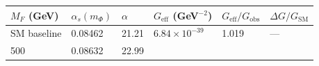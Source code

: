 \documentclass[
  11pt,
]{article}
\begin{document}
\begin{longtable}[]{@{}llllll@{}}
\toprule
\begin{minipage}[b]{0.14\columnwidth}\raggedright
\(M_F\) (GeV)\strut
\end{minipage} & \begin{minipage}[b]{0.14\columnwidth}\raggedright
\(\alpha_s(m_\Phi)\)\strut
\end{minipage} & \begin{minipage}[b]{0.14\columnwidth}\raggedright
\(\alpha\)\strut
\end{minipage} & \begin{minipage}[b]{0.14\columnwidth}\raggedright
\(G_{\text{eff}}\) (GeV\(^{-2}\))\strut
\end{minipage} & \begin{minipage}[b]{0.14\columnwidth}\raggedright
\(G_{\text{eff}}/G_{\text{obs}}\)\strut
\end{minipage} & \begin{minipage}[b]{0.14\columnwidth}\raggedright
\(\Delta G/G_{\text{SM}}\)\strut
\end{minipage}\tabularnewline
\midrule
\endhead
\begin{minipage}[t]{0.14\columnwidth}\raggedright
SM baseline\strut
\end{minipage} & \begin{minipage}[t]{0.14\columnwidth}\raggedright
0.08462\strut
\end{minipage} & \begin{minipage}[t]{0.14\columnwidth}\raggedright
21.21\strut
\end{minipage} & \begin{minipage}[t]{0.14\columnwidth}\raggedright
\(6.84 \times 10^{-39}\)\strut
\end{minipage} & \begin{minipage}[t]{0.14\columnwidth}\raggedright
1.019\strut
\end{minipage} & \begin{minipage}[t]{0.14\columnwidth}\raggedright
---\strut
\end{minipage}\tabularnewline
\begin{minipage}[t]{0.14\columnwidth}\raggedright
500\strut
\end{minipage} & \begin{minipage}[t]{0.14\columnwidth}\raggedright
0.08632\strut
\end{minipage} & \begin{minipage}[t]{0.14\columnwidth}\raggedright
22.99\strut
\end{minipage} & \begin{minipage}[t]{0.14\columnwidth}\raggedright

\end{minipage}
\end{longtable}
\end{document}
